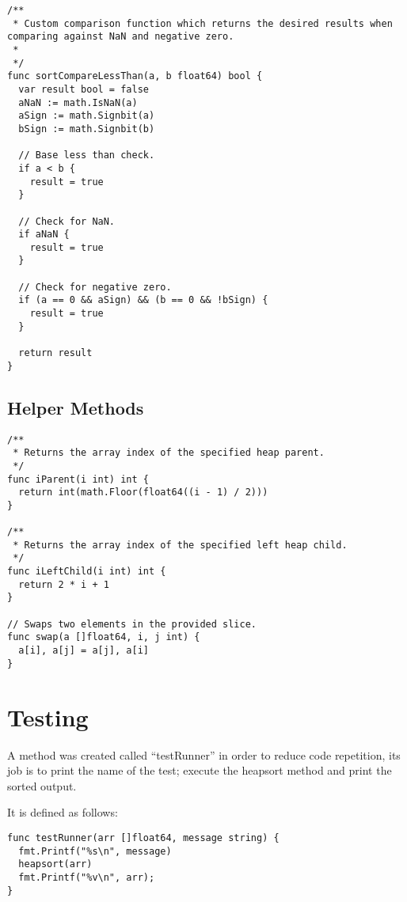 \documentclass{article}
\begin{document}
\begin{lstlisting}[language=Golang, caption=Custom comparison function used in order to sort negative zero entries and NaN entries correctly]
/**
 * Custom comparison function which returns the desired results when comparing against NaN and negative zero.
 *
 */
func sortCompareLessThan(a, b float64) bool {
  var result bool = false
  aNaN := math.IsNaN(a)
  aSign := math.Signbit(a)
  bSign := math.Signbit(b)

  // Base less than check.
  if a < b {
    result = true
  }

  // Check for NaN.
  if aNaN {
    result = true
  }

  // Check for negative zero.
  if (a == 0 && aSign) && (b == 0 && !bSign) {
    result = true
  }

  return result
}
\end{lstlisting}

\subsection{Helper Methods}

\begin{lstlisting}[language=Golang, caption=Helper functions used by the implementation. iParent and iLeftChild are both methods related to heap management and swap simply swaps elements in the provided slice.]
/**
 * Returns the array index of the specified heap parent.
 */
func iParent(i int) int {
  return int(math.Floor(float64((i - 1) / 2)))
}

/**
 * Returns the array index of the specified left heap child.
 */
func iLeftChild(i int) int {
  return 2 * i + 1
}

// Swaps two elements in the provided slice.
func swap(a []float64, i, j int) {
  a[i], a[j] = a[j], a[i]
}
\end{lstlisting}

\section{Testing}
A method was created called ``testRunner'' in order to reduce code repetition, its job is to print the name of the test; execute the heapsort method and print the sorted output.

It is defined as follows:
\begin{lstlisting}[language=Golang, caption=testRunner definition]
func testRunner(arr []float64, message string) {
  fmt.Printf("%s\n", message)
  heapsort(arr)
  fmt.Printf("%v\n", arr);
}
\end{lstlisting}
\end{document}
